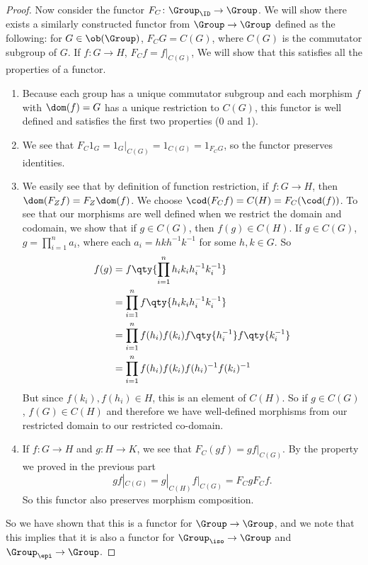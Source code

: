 \documentclass[main.tex]{subfiles}
\begin{document}
\begin{proof}
Now consider the functor $F_C\colon  \Group_{\ID} \rightarrow \Group$. We will
show there exists a similarly constructed functor from $\Group \rightarrow
\Group$ defined as the following: for $G \in \ob(\Group)$, $F_CG = C(G)$, where
$ C(G) $ is the commutator subgroup of $G$. If $f \colon G \rightarrow H$, $F_Cf
= f|_{C(G)}$, We will show that this satisfies all the properties of a functor.
\begin{enumerate}
	\item Because each group has a unique commutator subgroup and each morphism
		$f$ with $\dom(f) = G$ has a unique restriction to $C(G)$, this functor
		is well defined and satisfies the first two properties (0 and 1).
	\item We see that $F_{C} 1_{G} = 1_{G}|_{C(G)} = 1_{C(G)} = 1_{F_{C}G}$, so
		the functor preserves identities.
	\item We easily see that by definition of function restriction, if $f\colon
		G \rightarrow H$, then $\dom(F_{Z}f) = F_{Z}\dom(f)$. We choose
		$\cod(F_{C}f) = C(H) = F_C(\cod(f))$. To see that our morphisms are well
		defined when we restrict the domain and codomain, we show that if $g \in
		C(G)$, then $f(g) \in C(H)$. If $g \in C(G)$, $g = \prod_{i = 1}^{n} a_i$,
		where each $a_i = hkh^{-1}k^{-1}$ for some $h,k \in G$. So
		\begin{align*}
			f(g) &= f\qty{\prod_{i = 1}^{n} h_ik_ih_i^{-1}k_i^{-1}} \\ &=
			\prod_{i = 1}^{n} f\qty{h_ik_ih_i^{-1}k_i^{-1}} \\ &=
			\prod_{i = 1}^{n} f(h_i)f(k_i)f\qty{h_i^{-1}}f\qty{k_i^{-1}} \\ &=
			\prod_{i = 1}^{n} f(h_i)f(k_i)f(h_i)^{-1}f(k_i)^{-1}
		\end{align*}
		But since $f(k_i), f(h_i) \in H$,
		this is an element of $C(H)$. So if $g \in C(G)$, $f(G) \in C(H)$ and
		therefore we have well-defined morphisms from our restricted domain to
		our restricted co-domain.
	\item If $f\colon G \rightarrow H$ and $g\colon H \rightarrow K$, we see
		that $F_C(gf) = gf|_{C(G)}$. By the property we proved in the previous
		part \[gf|_{C(G)} = g|_{C(H)}f|_{C(G)} = F_CgF_Cf.\] So this functor
		also preserves morphism composition.
\end{enumerate}

So we have shown that this is a functor for $\Group \rightarrow \Group$, and we
note that this implies that it is also a functor for $\Group_{\iso} \rightarrow
\Group$ and $\Group_{\epi} \rightarrow \Group$.


\end{proof}
\end{document}
